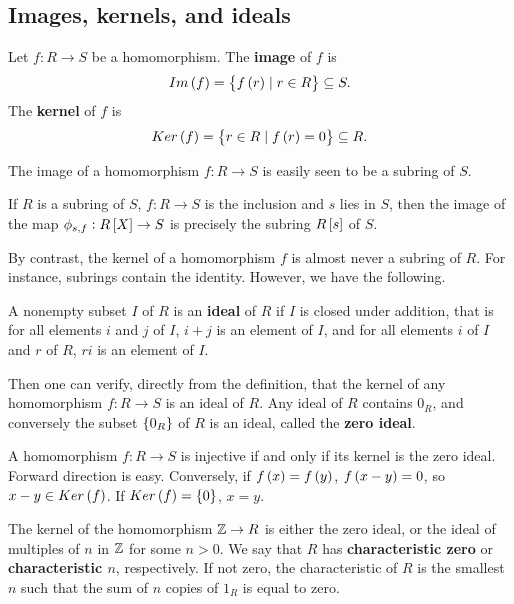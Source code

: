 \subsection{Images, kernels, and ideals}

\begin{definition}
Let $ f : R \to S $ be a homomorphism. The \textbf{image} of $ f $ is
$$ Im\br{f} = \cbr{f\br{r} \mid r \in R} \subseteq S. $$
The \textbf{kernel} of $ f $ is
$$ Ker\br{f} = \cbr{r \in R \mid f\br{r} = 0} \subseteq R. $$
\end{definition}

The image of a homomorphism $ f : R \to S $ is easily seen to be a subring of $ S $.

\begin{example*}
If $ R $ is a subring of $ S $, $ f : R \to S $ is the inclusion and $ s $ lies in $ S $, then the image of the map $ \phi_{s, f} : R\sbr{X} \to S $ is precisely the subring $ R\sbr{s} $ of $ S $.
\end{example*}

By contrast, the kernel of a homomorphism $ f $ is almost never a subring of $ R $. For instance, subrings contain the identity. However, we have the following.


\begin{definition}
A nonempty subset $ I $ of $ R $ is an \textbf{ideal} of $ R $ if $ I $ is closed under addition, that is for all elements $ i $ and $ j $ of $ I $, $ i + j $ is an element of $ I $, and for all elements $ i $ of $ I $ and $ r $ of $ R $, $ ri $ is an element of $ I $.
\end{definition}

Then one can verify, directly from the definition, that the kernel of any homomorphism $ f : R \to S $ is an ideal of $ R $. Any ideal of $ R $ contains $ 0_R $, and conversely the subset $ \cbr{0_R} $ of $ R $ is an ideal, called the \textbf{zero ideal}.

\begin{note*}
A homomorphism $ f : R \to S $ is injective if and only if its kernel is the zero ideal. Forward direction is easy. Conversely, if $ f\br{x} = f\br{y} $, $ f\br{x - y} = 0 $, so $ x - y \in Ker\br{f} $. If $ Ker\br{f} = \cbr{0} $, $ x = y $.
\end{note*}

The kernel of the homomorphism $ \mathbb{Z} \to R $ is either the zero ideal, or the ideal of multiples of $ n $ in $ \mathbb{Z} $ for some $ n > 0 $. We say that $ R $ has \textbf{characteristic zero} or \textbf{characteristic $ n $}, respectively. If not zero, the characteristic of $ R $ is the smallest $ n $ such that the sum of $ n $ copies of $ 1_R $ is equal to zero.

